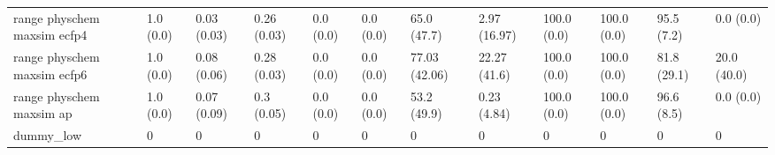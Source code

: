 \begin{tabular}{llllllllllll}
range physchem maxsim ecfp4 & {\cellcolor[HTML]{F6FCFD}} \color[HTML]{000000} 1.0 (0.0) & {\cellcolor[HTML]{F3FAFC}} \color[HTML]{000000} 0.03 (0.03) & {\cellcolor[HTML]{CAEBE5}} \color[HTML]{000000} 0.26 (0.03) & {\cellcolor[HTML]{F7FCFD}} \color[HTML]{000000} 0.0 (0.0) & {\cellcolor[HTML]{F7FCFD}} \color[HTML]{000000} 0.0 (0.0) & {\cellcolor[HTML]{3BA76C}} \color[HTML]{F1F1F1} 65.0 (47.7) & {\cellcolor[HTML]{F3FAFC}} \color[HTML]{000000} 2.97 (16.97) & {\cellcolor[HTML]{00441B}} \color[HTML]{F1F1F1} 100.0 (0.0) & {\cellcolor[HTML]{00441B}} \color[HTML]{F1F1F1} 100.0 (0.0) & {\cellcolor[HTML]{005221}} \color[HTML]{F1F1F1} 95.5 (7.2) & {\cellcolor[HTML]{F7FCFD}} \color[HTML]{000000} 0.0 (0.0) \\
range physchem maxsim ecfp6 & {\cellcolor[HTML]{F6FCFD}} \color[HTML]{000000} 1.0 (0.0) & {\cellcolor[HTML]{F6FCFD}} \color[HTML]{000000} 0.08 (0.06) & {\cellcolor[HTML]{C0E7DF}} \color[HTML]{000000} 0.28 (0.03) & {\cellcolor[HTML]{F7FCFD}} \color[HTML]{000000} 0.0 (0.0) & {\cellcolor[HTML]{F7FCFD}} \color[HTML]{000000} 0.0 (0.0) & {\cellcolor[HTML]{1D8640}} \color[HTML]{F1F1F1} 77.03 (42.06) & {\cellcolor[HTML]{D1EEEA}} \color[HTML]{000000} 22.27 (41.6) & {\cellcolor[HTML]{00441B}} \color[HTML]{F1F1F1} 100.0 (0.0) & {\cellcolor[HTML]{00441B}} \color[HTML]{F1F1F1} 100.0 (0.0) & {\cellcolor[HTML]{107A37}} \color[HTML]{F1F1F1} 81.8 (29.1) & {\cellcolor[HTML]{D6F0EE}} \color[HTML]{000000} 20.0 (40.0) \\
range physchem maxsim ap & {\cellcolor[HTML]{F6FCFD}} \color[HTML]{000000} 1.0 (0.0) & {\cellcolor[HTML]{F7FCFD}} \color[HTML]{000000} 0.07 (0.09) & {\cellcolor[HTML]{B8E4DB}} \color[HTML]{000000} 0.3 (0.05) & {\cellcolor[HTML]{F7FCFD}} \color[HTML]{000000} 0.0 (0.0) & {\cellcolor[HTML]{F7FCFD}} \color[HTML]{000000} 0.0 (0.0) & {\cellcolor[HTML]{5CBD98}} \color[HTML]{F1F1F1} 53.2 (49.9) & {\cellcolor[HTML]{F7FCFD}} \color[HTML]{000000} 0.23 (4.84) & {\cellcolor[HTML]{00441B}} \color[HTML]{F1F1F1} 100.0 (0.0) & {\cellcolor[HTML]{00441B}} \color[HTML]{F1F1F1} 100.0 (0.0) & {\cellcolor[HTML]{004E1F}} \color[HTML]{F1F1F1} 96.6 (8.5) & {\cellcolor[HTML]{F7FCFD}} \color[HTML]{000000} 0.0 (0.0) \\
dummy_low & {\cellcolor[HTML]{F7FCFD}} \color[HTML]{000000} 0 & {\cellcolor[HTML]{F7FCFD}} \color[HTML]{000000} 0 & {\cellcolor[HTML]{F7FCFD}} \color[HTML]{000000} 0 & {\cellcolor[HTML]{F7FCFD}} \color[HTML]{000000} 0 & {\cellcolor[HTML]{F7FCFD}} \color[HTML]{000000} 0 & {\cellcolor[HTML]{F7FCFD}} \color[HTML]{000000} 0 & {\cellcolor[HTML]{F7FCFD}} \color[HTML]{000000} 0 & {\cellcolor[HTML]{F7FCFD}} \color[HTML]{000000} 0 & {\cellcolor[HTML]{F7FCFD}} \color[HTML]{000000} 0 & {\cellcolor[HTML]{F7FCFD}} \color[HTML]{000000} 0 & {\cellcolor[HTML]{F7FCFD}} \color[HTML]{000000} 0 \\

\end{tabular}
